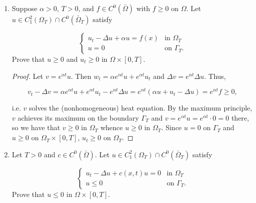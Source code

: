 \documentclass[11pt,oneside,english]{amsart}
\theoremstyle{definition}
\begin{document}
\begin{enumerate}
\begin{enumerate}
\pagebreak

\item Prove $v:=|Du|^2+u_t^2$ is a subsolution, whenever $u$ solves the heat equation.

\begin{proof}
Suppose $u$ solves the heat equation and define $v:=|Du|^2+u_t^2$. Since $u$ solves the heat equation, so does $u_t$ and $Du$, so by linearity and superposition, $v$ also solves the heat equation.
\end{proof}

\end{enumerate}

\setcounter{enumi}{4}

\item Suppose $\alpha >0$, $T>0$, and $f\in C^0(\bar{\Omega})$ with $f\geq 0$ on $\Omega$. Let $u\in C^2_1(\Omega_T)\cap C^0(\bar{\Omega}_T)$ satisfy

\[
\begin{cases} u_t-\Delta u+\alpha u=f(x) & \text{in }\Omega_T\\ u=0 & \text{on }\Gamma_T.\end{cases}
\]
Prove that $u\geq0$ and $u_t\geq 0$ in $\Omega\times[0,T]$.

\begin{proof}
Let $v=e^{\alpha t}u$. Then $w_t=\alpha e^{\alpha t}u+e^{\alpha t}u_t$ and $\Delta v=e^{\alpha t}\Delta u$. Thus,

\[
v_t-\Delta v=\alpha e^{\alpha t}u+e^{\alpha t}u_t-e^{\alpha t}\Delta u=e^{\alpha t}\left(\alpha u+u_t-\Delta u\right)=e^{\alpha t}f\geq0,
\]

i.e. $v$ solves the (nonhomogeneous) heat equation. By the maximum principle, $v$ achieves its maximum on the boundary $\Gamma_T$ and $v=e^{\alpha t}u=e^{\alpha t}\cdot 0=0$ there, so we have that $v\geq0$ in $\Omega_T$ whence $u\geq0$ in $\Omega_T$. Since $u=0$ on $\Gamma_T$ and $u\geq0$ on $\Omega_T\times[0,T]$, $u_t\geq 0$ on $\Omega_T$.
\end{proof}

\item Let $T>0$ and $c\in C^0(\bar{\Omega})$. Let $u\in C^2_1(\Omega_T)\cap C^0(\bar{\Omega}_T)$ satisfy

\[
\begin{cases} u_t-\Delta u+c(x,t)u=0 & \text{in }\Omega_T\\ u\leq0 & \text{on }\Gamma_T.\end{cases}
\]
Prove that $u\leq0$ in $\Omega\times[0,T]$.


\end{enumerate}
\end{document}
